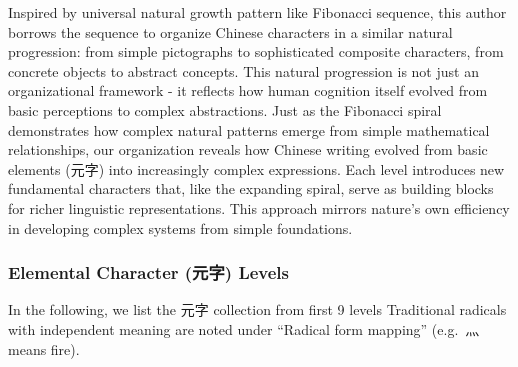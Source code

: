 Inspired by universal natural growth pattern like Fibonacci sequence,
this author borrows the sequence to organize Chinese characters in a
similar natural progression: from simple pictographs to sophisticated
composite characters, from concrete objects to abstract concepts. This
natural progression is not just an organizational framework - it
reflects how human cognition itself evolved from basic perceptions to
complex abstractions. Just as the Fibonacci spiral demonstrates how
complex natural patterns emerge from simple mathematical relationships,
our organization reveals how Chinese writing evolved from basic elements
(元字) into increasingly complex expressions. Each level introduces new
fundamental characters that, like the expanding spiral, serve as
building blocks for richer linguistic representations. This approach
mirrors nature's own efficiency in developing complex systems from
simple foundations.

\hypertarget{elemental-character-ux5143ux5b57-levels}{%
\subsubsection{Elemental Character (元字)
Levels}\label{elemental-character-ux5143ux5b57-levels}}

In the following, we list the 元字 collection from first 9 levels
Traditional radicals with independent meaning are noted under ``Radical
form mapping'' (e.g.~灬 means fire).

